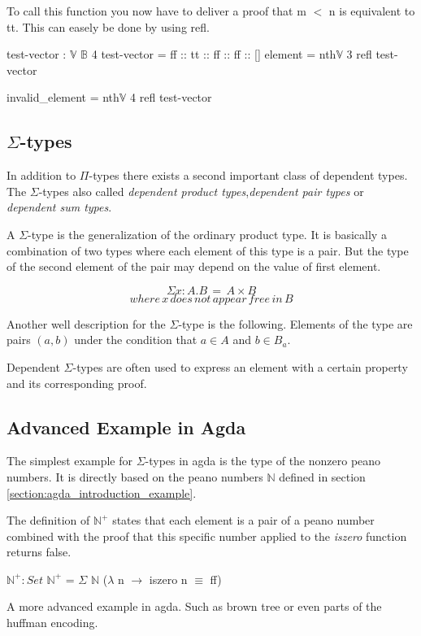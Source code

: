 To call this function you now have to deliver a proof that m $<$ n is equivalent to tt. This can easely be done by using refl. 
\begin{codesnippet}[mathescape=true, caption={Usage of \emph{nth} function in Agda}, label={codeSnippet:vector_nth_usage}]
test-vector : $\mathbb{V}$ $\mathbb{B}$ 4
test-vector = ff :: tt :: ff :: ff :: []
element = nth$\mathbb{V}$ 3 refl test-vector

invalid_element = nth$\mathbb{V}$ 4 refl test-vector
\end{codesnippet}


\subsection{$\Sigma$-types}
In addition to $\Pi$-types there exists a second important class of dependent types. 
The $\Sigma$-types also called \emph{dependent product types}\cite{10.1145/2841316},\emph{dependent pair types}\cite{10.1145/2841316} or \emph{dependent sum types}\cite{10.5555/1076265}.

A $\Sigma$-type is the generalization of the ordinary product type. 
It is basically a combination of two types where each element of this type is a pair. 
But the type of the second element of the pair may depend on the value of first element.

$$\Sigma x: A.B \,= \, A \times B$$
$$where \, x \, does \, not \, appear \, free \, in \, B$$


Another well description for the $\Sigma$-type is the following. 
Elements of the type are pairs $(a, b)$ under the condition that $a \in A$ and $b \in B_a$.

Dependent $\Sigma$-types are often used to express an element with a certain property and its corresponding proof.

\subsection{Advanced Example in Agda}
The simplest example for $\Sigma$-types in agda is the type of the nonzero peano numbers.
It is directly based on the peano numbers $\mathbb{N}$ defined in section \ref{section:agda_introduction_example}.

The definition of $\mathbb{N}^+$ states that each element is a pair of a peano number combined with the proof that this specific number applied to the \emph{iszero} function returns false.

\begin{codesnippet}[mathescape=true, caption={Definition of nonzero peano numbers in Agda}, label={codeSnippet:nonzero_natural_number}]
$\mathbb{N}^+ : Set$
$\mathbb{N}^+$ = $\Sigma$ $\mathbb{N}$ ($\lambda$ n $\rightarrow$ iszero n $\equiv$ ff)
\end{codesnippet}

A more advanced example in agda. Such as brown tree or even parts of the huffman encoding.